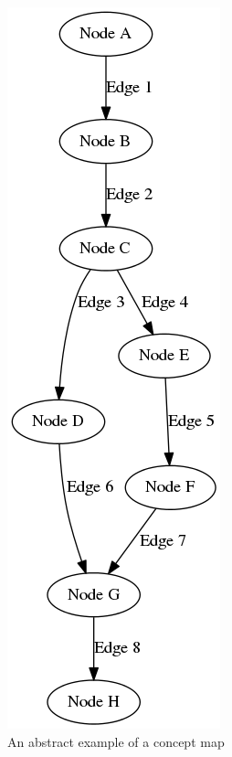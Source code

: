 \begin{figure}
    \centering
    \begin{subfigure}{0.4\textwidth}
        \centering
        \includegraphics[height=.5\textheight]{img/examplemap.png}
        \caption{An abstract example of a concept map}
        \label{fig:examplemap}
    \end{subfigure}
    \qquad
    \begin{subfigure}{0.4\textwidth}
        \centering

\end{subfigure}
\end{figure}
